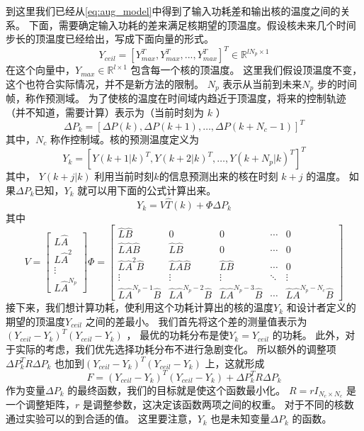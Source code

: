 到这里我们已经从\eqref{eq:aug_model}中得到了输入功耗差和输出核的温度之间的关系。
下面，需要确定输入功耗的差来满足核期望的顶温度。假设核未来几个时间步长的顶温度已经给出，写成下面向量的形式。
\begin{equation*}
Y_{ceil} = [Y_{max}^T, Y_{max}^T, ..., Y_{max}^T]^T \in \mathbb{R}^{lN_p \times 1}
\end{equation*}
在这个向量中，$Y_{max} \in \mathbb{R}^{l \times 1}$ 包含每一个核的顶温度。
这里我们假设顶温度不变，这个也符合实际情况，并不是新方法的限制。
$N_p$ 表示从当前到未来$N_p$ 步的时间帧，称作预测域。
为了使核的温度在时间域内趋近于顶温度，将来的控制轨迹（并不知道，需要计算）表示为（当前时刻为 $k$ ）
\begin{equation*}
\Delta P_k = [\Delta P(k), \Delta P(k+1), \ldots, \Delta P(k+N_c-1)]^T
\end{equation*}
其中，$N_c$ 称作控制域。核的预测温度定义为
\begin{equation*}
Y_k = [Y(k+1|k)^T, Y(k+2|k)^T, \ldots, Y(k+N_p|k)^T]^T
\end{equation*}
其中， $Y(k+j|k)$ 利用当前时刻$k$的信息预测出来的核在时刻 $k+j$ 的温度。
如果$\Delta P_k$已知，$Y_k$ 就可以用下面的公式计算出来。
\begin{equation}\label{eq:pred_eq}
Y_k = V\hat{T}(k) + \Phi \Delta P_k
\end{equation}
其中 
\begin{equation*}
V = 
\left[
\begin{array}{c}
\hat{L}\hat{A}\\
\hat{L}\hat{A}^2\\
\vdots\\
\hat{L}\hat{A}^{N_p}
\end{array}
\right]
\Phi = 
\left[
\begin{array}{ccccc}
\hat{L} \hat{B} & 0  & 0 & \cdots & 0\\
\hat{L} \hat{A} \hat{B} & \hat{L} \hat{B} & 0 & \cdots & 0 \\
\hat{L} \hat{A}^2 \hat{B} & \hat{L} \hat{A} \hat{B} & \hat{L} \hat{B} & \cdots & 0\\
\vdots &  \vdots & \vdots & \ddots & \vdots \\
\hat{L} \hat{A}^{N_p-1} \hat{B} & \hat{L} \hat{A}^{N_p-2} \hat{B} &
\hat{L} \hat{A}^{N_p-3} \hat{B} & \cdots & \hat{L} \hat{A}^{N_p-N_c} \hat{B}
\end{array}
\right]
\end{equation*}
接下来，我们想计算功耗，使利用这个功耗计算出的核的温度$Y_k$  和设计者定义的期望的顶温度$Y_{ceil}$ 之间的差最小。
我们首先将这个差的测量值表示为$(Y_{ceil}-Y_k)^T(Y_{ceil}-Y_k)$ ， 最优的功耗分布是使$Y_k=Y_{ceil}$ 的功耗。
此外，对于实际的考虑，我们优先选择功耗分布不进行急剧变化。
所以额外的调整项 $\Delta P_k^TR\Delta P_k$ 也加到$(Y_{ceil}-Y_k)^T(Y_{ceil}-Y_k)$ 上，这就形成
\begin{equation}\label{eq:cost_fun}
F = (Y_{ceil}-Y_k)^T(Y_{ceil}-Y_k)+\Delta P_k^TR\Delta P_k
\end{equation}
作为变量$\Delta P_k$ 的最终函数，我们的目标就是使这个函数最小化。
$R=rI_{N_c \times N_c}$ 是一个调整矩阵，$r$ 是调整参数，这决定该函数两项之间的权重。
对于不同的核数通过实验可以的到合适的值。
这里要注意，$Y_k$ 也是未知变量$\Delta P_k$ 的函数。

